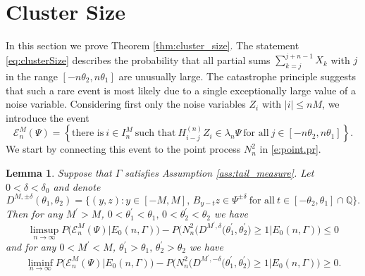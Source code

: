 \documentclass[11pt,reqno]{amsart}
\numberwithin{equation}{section}
\newcommand{\problem}[1]{{\color{red}  {Problems: #1}}}
\newtheorem{lemma}{Lemma}[section] %
\theoremstyle{definition}
\theoremstyle{remark}
\theoremstyle{definition}
\newcommand{\cE}{\mathcal{E}}
\newcommand{\QQ}{\mathbb{Q}}
\newcommand{\bbq}{\QQ}
\begin{document}
\section{Cluster Size}\label{sec:cluster_size}


In this section we prove Theorem \ref{thm:cluster_size}. The statement
\eqref{eq:clusterSize} describes the probability that all partial sums
$\sum_{k=j}^{j+n-1} X_k$ with $j$ in the range
$[-n\theta_2,n\theta_1]$ are unusually large. The catastrophe
principle suggests that such a rare event is most likely due to a
single exceptionally large value of a noise variable. Considering
first only the noise variables $Z_i$ with $|i|\leq nM$, we introduce
the event 
\begin{equation} \label{e:i.range}
\cE_n^M(\Psi) =
\left\{
\text{there is} \ i \in I_n^M \ \text{such that} \ 
H_{i-j}^{(n)} Z_i \in \lambda_n \Psi \ 
\text{for all} \  j \in [-n\theta_2,n\theta_1]
\right\}.
\end{equation}
We start by connecting this event to the point process $N_n^2$ in
\eqref{e:point.pr}. 

\begin{lemma}\label{lemma:cluster_equi_pt}
Suppose that $\Gamma$  satisfies Assumption \ref{ass:tail_measure}. Let
$0<\delta<\delta_0$ and denote 
\[
  D^{M,\pm\delta}(\theta_1,\theta_2) = \bigl\{(y, z): y \in [-M, M],\, B_{y-t}z
  \in \Psi^{\pm \delta} \ \text{for all} \
  t \in [-\theta_2, \theta_1]\cap \bbq\bigr\}.
\] 
Then for any $M^\prime >M$, $   0<\theta_1^\prime<\theta_1, \,
0<\theta_2^\prime<\theta_2$ we have 
\begin{equation} \label{e:connect.N2}
  \limsup_{n\to \infty} P\bigl(\cE_n^M(\Psi) \big|E_0(n,\Gamma)\bigr)
    - P\bigl(N_n^2\bigl(D^{M^\prime,\delta}(\theta_1^\prime, \theta_2^\prime\bigr)
    \geq 1\big|E_0(n,\Gamma)\bigr) \leq 0 
  \end{equation}
and for any $0<M^\prime<M$, $   \theta_1^\prime>\theta_1, \,
\theta_2^\prime>\theta_2$ we have
\begin{equation} \label{e:connect.N2a}
  \liminf_{n\to \infty} P\bigl(\cE_n^M(\Psi) \big|E_0(n,\Gamma)\bigr)
    - P\bigl(N_n^2\bigl(D^{M^\prime,-\delta}(\theta_1^\prime, \theta_2^\prime\bigr)
    \geq 1\big|E_0(n,\Gamma)\bigr) \geq 0.  
  \end{equation}
\end{lemma}
\end{document}
